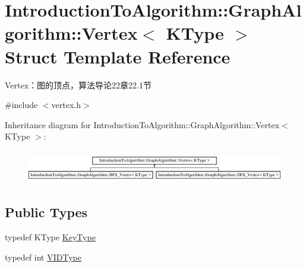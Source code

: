 \hypertarget{struct_introduction_to_algorithm_1_1_graph_algorithm_1_1_vertex}{}\section{Introduction\+To\+Algorithm\+:\+:Graph\+Algorithm\+:\+:Vertex$<$ K\+Type $>$ Struct Template Reference}
\label{struct_introduction_to_algorithm_1_1_graph_algorithm_1_1_vertex}


Vertex：图的顶点，算法导论22章22.1节  




{\ttfamily \#include $<$vertex.\+h$>$}

Inheritance diagram for Introduction\+To\+Algorithm\+:\+:Graph\+Algorithm\+:\+:Vertex$<$ K\+Type $>$\+:\begin{figure}[H]
\begin{center}
\leavevmode
\includegraphics[height=1.465969cm]{struct_introduction_to_algorithm_1_1_graph_algorithm_1_1_vertex}
\end{center}
\end{figure}
\subsection*{Public Types}
\begin{DoxyCompactItemize}
\item 
typedef K\+Type \hyperlink{struct_introduction_to_algorithm_1_1_graph_algorithm_1_1_vertex_a14e958c58a404474853491eb811954cc}{Key\+Type}
\item 
typedef int \hyperlink{struct_introduction_to_algorithm_1_1_graph_algorithm_1_1_vertex_a290c84c0dcf159f833c72c47a2d4d44a}{V\+I\+D\+Type}
\end{DoxyCompactItemize}
